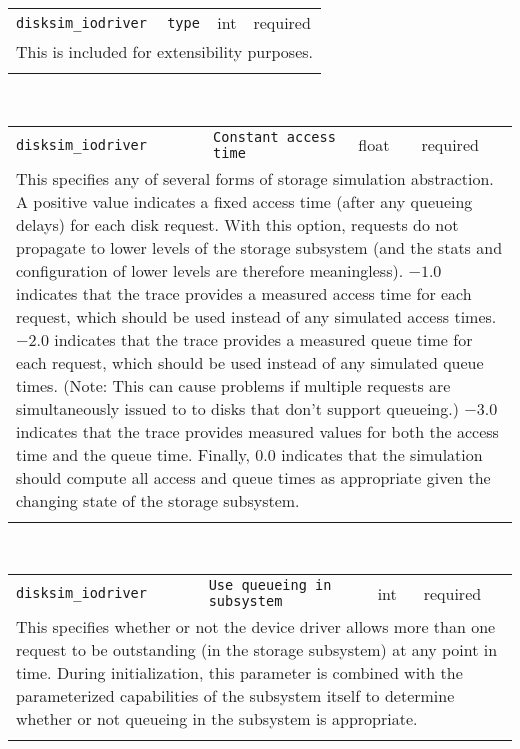 \noindent 
\begin{tabular}{|p{\lpmodwidth}|p{\lpnamewidth}|p{0.5in}|p{0.5in}|}
\cline{1-4}
\texttt{disksim\_iodriver} & \texttt{type} & int & required \\ 
\cline{1-4}
\multicolumn{4}{|p{6in}|}{
This is included for extensibility purposes.
}\\ 
\cline{1-4}
\multicolumn{4}{p{5in}}{}\\
\end{tabular}\\ 
\noindent 
\begin{tabular}{|p{\lpmodwidth}|p{\lpnamewidth}|p{0.5in}|p{0.5in}|}
\cline{1-4}
\texttt{disksim\_iodriver} & \texttt{Constant access time} & float & required \\ 
\cline{1-4}
\multicolumn{4}{|p{6in}|}{
This specifies any of several forms of storage simulation abstraction.
A positive value indicates a fixed access time (after any queueing
delays) for each disk request. With this option, requests do not
propagate to lower levels of the storage subsystem (and the stats and
configuration of lower levels are therefore meaningless). $-1.0$
indicates that the trace provides a measured access time for each
request, which should be used instead of any simulated access times.
$-2.0$ indicates that the trace provides a measured queue time for
each request, which should be used instead of any simulated queue
times. (Note: This can cause problems if multiple requests are
simultaneously issued to to disks that don't support queueing.)
$-3.0$ indicates that the trace provides measured values for both the
access time and the queue time. Finally, $0.0$ indicates that the
simulation should compute all access and queue times as appropriate
given the changing state of the storage subsystem.
}\\ 
\cline{1-4}
\multicolumn{4}{p{5in}}{}\\
\end{tabular}\\ 
\noindent 
\begin{tabular}{|p{\lpmodwidth}|p{\lpnamewidth}|p{0.5in}|p{0.5in}|}
\cline{1-4}
\texttt{disksim\_iodriver} & \texttt{Use queueing in subsystem} & int & required \\ 
\cline{1-4}
\multicolumn{4}{|p{6in}|}{
This specifies whether or not the device driver allows more than one
request to be outstanding (in the storage subsystem) at any point in
time. During initialization, this parameter is combined with the
parameterized capabilities of the subsystem itself to determine
whether or not queueing in the subsystem is appropriate.
}\\ 
\cline{1-4}
\multicolumn{4}{p{5in}}{}\\
\end{tabular}\\ 

